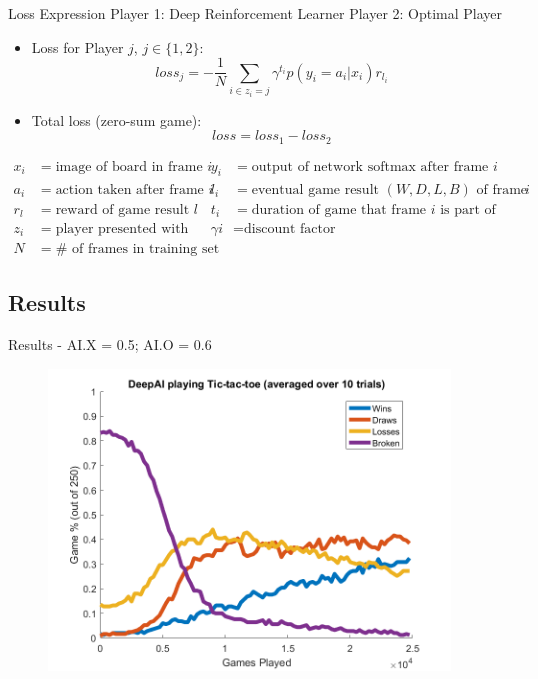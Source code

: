 \documentclass[11pt]{beamer}
\begin{document}
	
	\begin{frame}[shrink=15]{Loss Expression}
		Player 1: Deep Reinforcement Learner \qquad \qquad Player 2: Optimal Player \\
		\vspace{5 mm}
		\begin{itemize}
			\item Loss for Player $j$, $j \in \{1,2\}$:
			\begin{equation}
			loss_j = -\frac{1}{N} \sum_{i \in z_i=j} \gamma^{t_i} p(y_i=a_i|x_i) r_{l_i} 
			\end{equation}
			\item Total loss (zero-sum game):
			\begin{equation}
			loss = loss_1 - loss_2
			\end{equation}
		\end{itemize}
		
		\begin{align*}
		x_i &= \text{image of board in frame } i & y_i &= \text{output of network softmax after frame } i \\
		a_i &= \text{action taken after frame } i  & l_i &= \text{eventual game result $(W,D,L,B)$ of frame } i \\
		r_l &= \text{reward of game result } l & t_i &= \text{duration of game that frame } i \text{ is part of} \\
		z_i &= \text{player presented with frame } i & \gamma &= \text{discount factor} \\
		N &= \#\text{ of frames in training set}
		\end{align*}	
	\end{frame}
	
	\subsection{Results}
	\begin{frame}{Results - AI.X = 0.5; AI.O = 0.6}
		\begin{figure}[Results]
			\centering
			\includegraphics[width=0.95\textwidth]{Figures/results05X06O.png}
		\end{figure}
	\end{frame}
	
\end{document}
